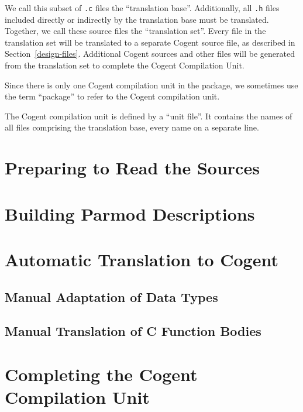 \documentclass[a4paper]{report}
\newcommand{\code}[1]{\textnormal{\texttt{#1}}}
\begin{document}
We call this subset of \code{.c} files the ``translation base''. Additionally, all \code{.h} files
included directly or indirectly by the translation base must be translated. Together, we call these
source files the ``translation set''. Every file in the translation set will be translated to a 
separate Cogent source file, as described in Section~\ref{design-files}. Additional Cogent sources
and other files will be generated from the translation set to complete the Cogent Compilation Unit.

Since there is only one Cogent compilation unit in the package, we sometimes use the term ``package''
to refer to the Cogent compilation unit. 

The Cogent compilation unit is defined by a ``unit file''. It contains the names of all files
comprising the translation base, every name on a separate line. 

\section{Preparing to Read the Sources}
\label{app-prep}
%

\section{Building Parmod Descriptions}
\label{app-parmod}


\section{Automatic Translation to Cogent}
\label{app-transauto}


\subsection{Manual Adaptation of Data Types}
\label{app-transtype}


\subsection{Manual Translation of C Function Bodies}
\label{app-transfunction}


\section{Completing the Cogent Compilation Unit}
\label{app-unit}
%
\end{document}
